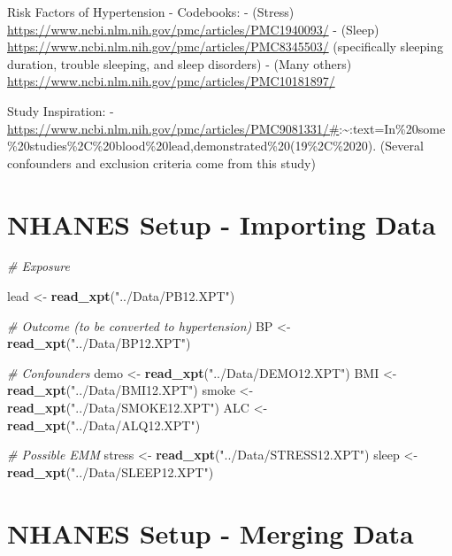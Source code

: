 \documentclass[
]{article}
\newenvironment{Shaded}{\begin{snugshade}}{\end{snugshade}}
\newcommand{\CommentTok}[1]{\textcolor[rgb]{0.56,0.35,0.01}{\textit{#1}}}
\newcommand{\FunctionTok}[1]{\textcolor[rgb]{0.13,0.29,0.53}{\textbf{#1}}}
\newcommand{\NormalTok}[1]{#1}
\newcommand{\OtherTok}[1]{\textcolor[rgb]{0.56,0.35,0.01}{#1}}
\newcommand{\StringTok}[1]{\textcolor[rgb]{0.31,0.60,0.02}{#1}}
\begin{document}
Risk Factors of Hypertension - Codebooks: - (Stress)
\url{https://www.ncbi.nlm.nih.gov/pmc/articles/PMC1940093/} - (Sleep)
\url{https://www.ncbi.nlm.nih.gov/pmc/articles/PMC8345503/}
(specifically sleeping duration, trouble sleeping, and sleep disorders)
- (Many others)
\url{https://www.ncbi.nlm.nih.gov/pmc/articles/PMC10181897/}

Study Inspiration: -
\url{https://www.ncbi.nlm.nih.gov/pmc/articles/PMC9081331/\#}:\textasciitilde:text=In\%20some\%20studies\%2C\%20blood\%20lead,demonstrated\%20(19\%2C\%2020).
(Several confounders and exclusion criteria come from this study)

\section{NHANES Setup - Importing
Data}\label{nhanes-setup---importing-data}

\begin{Shaded}
\begin{Highlighting}[]
\CommentTok{\# Exposure}

\NormalTok{lead }\OtherTok{\textless{}{-}} \FunctionTok{read\_xpt}\NormalTok{(}\StringTok{"../Data/PB12.XPT"}\NormalTok{)}

\CommentTok{\# Outcome (to be converted to hypertension)}
\NormalTok{BP }\OtherTok{\textless{}{-}} \FunctionTok{read\_xpt}\NormalTok{(}\StringTok{"../Data/BP12.XPT"}\NormalTok{)}

\CommentTok{\# Confounders}
\NormalTok{demo }\OtherTok{\textless{}{-}} \FunctionTok{read\_xpt}\NormalTok{(}\StringTok{"../Data/DEMO12.XPT"}\NormalTok{)}
\NormalTok{BMI }\OtherTok{\textless{}{-}} \FunctionTok{read\_xpt}\NormalTok{(}\StringTok{"../Data/BMI12.XPT"}\NormalTok{)}
\NormalTok{smoke }\OtherTok{\textless{}{-}} \FunctionTok{read\_xpt}\NormalTok{(}\StringTok{"../Data/SMOKE12.XPT"}\NormalTok{)}
\NormalTok{ALC }\OtherTok{\textless{}{-}} \FunctionTok{read\_xpt}\NormalTok{(}\StringTok{"../Data/ALQ12.XPT"}\NormalTok{)}

\CommentTok{\# Possible EMM}
\NormalTok{stress }\OtherTok{\textless{}{-}} \FunctionTok{read\_xpt}\NormalTok{(}\StringTok{"../Data/STRESS12.XPT"}\NormalTok{)}
\NormalTok{sleep }\OtherTok{\textless{}{-}} \FunctionTok{read\_xpt}\NormalTok{(}\StringTok{"../Data/SLEEP12.XPT"}\NormalTok{)}
\end{Highlighting}
\end{Shaded}

\section{NHANES Setup - Merging Data}\label{nhanes-setup---merging-data}
\end{document}
